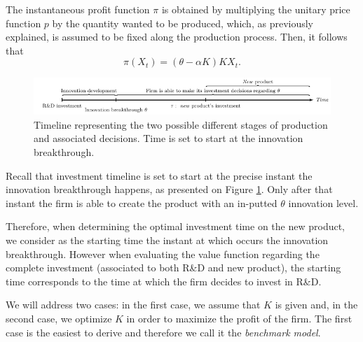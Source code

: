 The instantaneous profit function $\pi$ is obtained by multiplying the unitary price function $p$ by the quantity wanted to be produced, which, as previously explained, is assumed to be fixed along the production process. Then, it follows that
\begin{equation}
\pi(X_t)=(\theta-\alpha K)K X_t.
\label{prob1:pi}
\end{equation}

\begin{figure}[!htb]
	\centering
	\includegraphics[width=\textwidth]{Prob1_CapOpt/1_timelinet.PNG}
	\caption{Timeline representing the two possible different stages of production and associated decisions. Time is set to start at the innovation breakthrough.}
	\label{1_time}
\end{figure}

Recall that investment timeline is set to start at the precise instant the innovation breakthrough happens, as presented on Figure \ref{1_time}. Only after that instant the firm is able to create the product with an in-putted $\theta$ innovation level.







Therefore, when determining the optimal investment time on the new product, we consider as the starting time the instant at which occurs the innovation breakthrough. However when evaluating the value function regarding the complete investment (associated to both R\&D and new product), the starting time corresponds to the time at which the firm decides to invest in R\&D.







We will address two cases: in the first case, we assume that $K$ is given and, in the second case, we optimize $K$ in order to maximize the profit of the firm. The first case is the easiest to derive and therefore we call it the \textit{benchmark model}.



